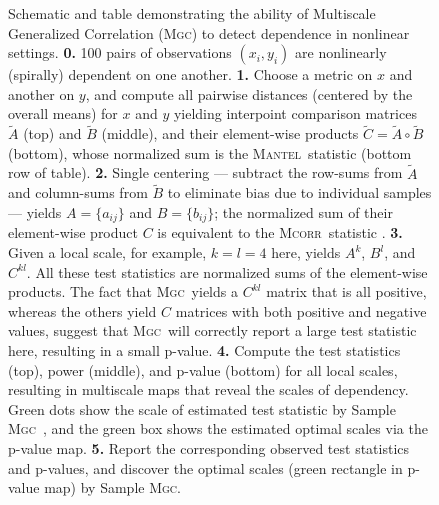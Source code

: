 \documentclass[11pt]{article}
\providecommand{\sct}[1]{{\normalfont\textsc{#1}}}
\newcommand{\Mgc}{\sct{Mgc}}
\newcommand{\Mcorr}{\sct{Mcorr}}
\newcommand{\Mantel}{\sct{Mantel}}
\begin{document}
\begin{figure}[htbp]
\caption{
Schematic  and table demonstrating the ability of Multiscale Generalized Correlation (\Mgc) to detect dependence in nonlinear settings. 
\textbf{0.} 100 pairs of observations $(x_i,y_i)$ are nonlinearly (spirally) dependent on one another.
% 
\textbf{1.} Choose a metric on $x$ and another on $y$, and compute all pairwise distances (centered by the overall means) for $x$ and $y$ yielding interpoint comparison matrices
 $\tilde{A}$ (top) and $\tilde{B}$ (middle), 
and their element-wise products $\tilde{C}=\tilde{A} \circ \tilde{B}$ (bottom), whose normalized sum is the  \Mantel~statistic \cite{Mantel1967} (bottom row of table).
% 
\textbf{2.} Single centering --- subtract the row-sums from $\tilde{A}$ and column-sums from $\tilde{B}$ to eliminate bias due to individual samples --- yields $A=\{a_{ij}\}$ and $B=\{b_{ij}\}$; the normalized sum of their  element-wise product  $C$ is equivalent to the  \Mcorr~statistic \cite{SzekelyRizzo2013a}.
% 
\textbf{3.} Given a local scale, for example, $k=l=4$ here, yields $A^{k}$, $B^{l}$, and $C^{kl}$.  All these test statistics are normalized sums of the element-wise products. The fact that \Mgc~yields a $C^{kl}$ matrix that is all positive, whereas the others yield $C$ matrices with both positive and negative values, suggest that \Mgc~will correctly report a large test statistic here, resulting in a small p-value.
\textbf{4.} Compute the test statistics (top), power (middle), and p-value (bottom) for all local scales, resulting in multiscale maps that reveal the scales of dependency. Green dots show the scale of estimated test statistic by Sample \Mgc~, and the green box shows the estimated optimal scales via the p-value map.
\textbf{5.} Report the corresponding observed test statistics and p-values, and discover the optimal scales (green rectangle in  p-value map) by Sample \Mgc.  
}
\end{figure}
\end{document}
